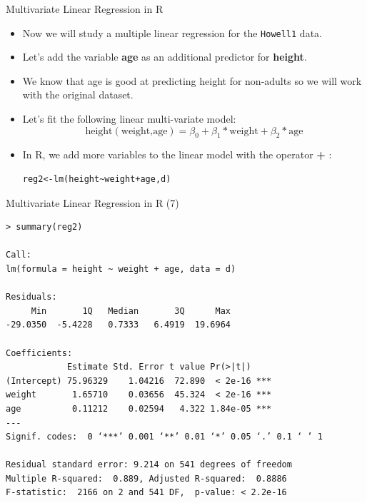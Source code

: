 \documentclass[handout]{beamer}
\begin{document}
\begin{frame}[fragile]{Multivariate Linear Regression in R}
\scriptsize{
\begin{itemize}
 \item  Now we will study a multiple linear regression for the \verb+Howell1+ data.
 \item Let's add the variable \textbf{age} as an additional predictor for \textbf{height}.
 \item We know that age is good at predicting height for non-adults so we will work with the original dataset.
 \item  Let's fit the following linear multi-variate model:
 \begin{displaymath}
 \text{height}(\text{weight,age})=\beta_{0}+\beta_{1}*\text{weight}+\beta_{2}*\text{age}
 \end{displaymath}
 \item In R, we add more variables to the linear model with the operator \textbf{+} :
\begin{verbatim}
reg2<-lm(height~weight+age,d)
\end{verbatim}



 
 \end{itemize}
 

} 
\end{frame}


\begin{frame}[fragile]{Multivariate Linear Regression in R (7)}
\scriptsize{

\begin{verbatim}
> summary(reg2)

Call:
lm(formula = height ~ weight + age, data = d)

Residuals:
     Min       1Q   Median       3Q      Max 
-29.0350  -5.4228   0.7333   6.4919  19.6964 

Coefficients:
            Estimate Std. Error t value Pr(>|t|)    
(Intercept) 75.96329    1.04216  72.890  < 2e-16 ***
weight       1.65710    0.03656  45.324  < 2e-16 ***
age          0.11212    0.02594   4.322 1.84e-05 ***
---
Signif. codes:  0 ‘***’ 0.001 ‘**’ 0.01 ‘*’ 0.05 ‘.’ 0.1 ‘ ’ 1

Residual standard error: 9.214 on 541 degrees of freedom
Multiple R-squared:  0.889,	Adjusted R-squared:  0.8886 
F-statistic:  2166 on 2 and 541 DF,  p-value: < 2.2e-16

\end{verbatim}


 

} 
\end{frame}
\end{document}
